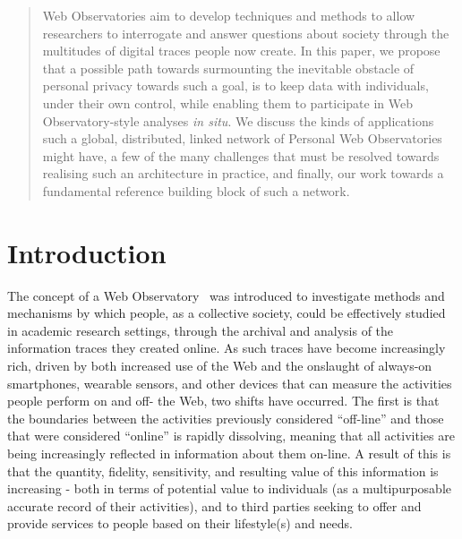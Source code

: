 \documentclass[letterpaper]{sig-alternate}
\begin{document}


\maketitle
\begin{abstract}
Web Observatories aim to develop techniques and methods to allow researchers to interrogate and answer questions about society through the multitudes of digital traces people now create.  In this paper, we propose that a possible path towards surmounting the inevitable obstacle of personal privacy towards such a goal, is to keep data with individuals, under their own control, while enabling them to participate in Web Observatory-style analyses \emph{in situ}.  We discuss the kinds of applications such a global, distributed, linked network of Personal Web Observatories might have, a few of the many challenges that must be resolved towards realising such an architecture in practice, and finally, our work towards a fundamental reference building block of such a network.
\end{abstract}



\section{Introduction}

The concept of a Web Observatory~\cite{Tiropanis2013,Hall2014} was introduced to investigate methods and mechanisms by which people, as a collective society, could be effectively studied in academic research settings, through the archival and analysis of the information traces they created online. As such traces have become increasingly rich, driven by both increased use of the Web and the onslaught of always-on smartphones, wearable sensors, and other devices that can measure the activities people perform on and off- the Web, two shifts have occurred. The first is that the boundaries between the activities previously considered ``off-line'' and those that were considered ``online'' is rapidly dissolving, meaning that all activities are being increasingly reflected in information about them on-line. A result of this is that the quantity, fidelity, sensitivity, and resulting value of this information is increasing - both in terms of potential value to individuals (as a multipurposable accurate record of their activities), and to third parties seeking to offer and provide services to people based on their lifestyle(s) and needs. 
\end{document}
